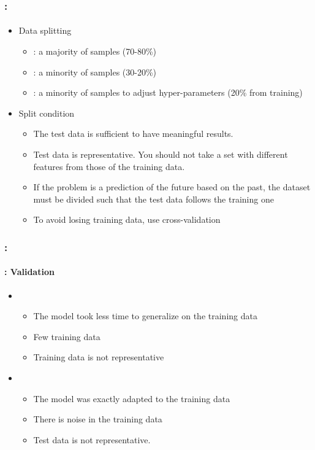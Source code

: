 \documentclass[xcolor=table]{beamer}
\begin{document}
\begin{frame}
	\frametitle{\insertshortsubtitle: \insertsection}
	\framesubtitle{\insertsubsection}
	
	\begin{itemize}
		\item Data splitting
		\begin{itemize}
			\item {}: a majority of samples (70-80\%)
			\item {}: a minority of samples (30-20\%)
			\item {}: a minority of samples to adjust hyper-parameters (20\% from training)
		\end{itemize}
		\item Split condition
		\begin{itemize}
			\item The test data is sufficient to have meaningful results.
			\item Test data is representative. You should not take a set with different features from those of the training data.
			\item If the problem is a prediction of the future based on the past, the dataset must be divided such that the test data follows the training one
			\item To avoid losing training data, use cross-validation
		\end{itemize}
	\end{itemize}
	
\end{frame}

\begin{frame}
	\frametitle{\insertshortsubtitle: \insertsection}
	\framesubtitle{\insertsubsection: Validation}
	
	\begin{itemize}
		\item {}
		\begin{itemize}
			\item The model took less time to generalize on the training data
			\item Few training data
			\item Training data is not representative
		\end{itemize}

		\item {}
		\begin{itemize}
			\item The model was exactly adapted to the training data
			\item There is noise in the training data
			\item Test data is not representative.
		\end{itemize}

	\end{itemize}
	
\end{frame}
\end{document}
